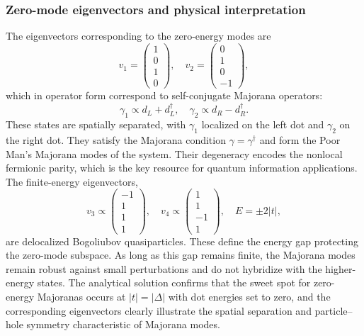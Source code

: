 \documentclass[11pt, letterpaper, titlepage]{article}
\begin{document}
\subsubsection{Zero-mode eigenvectors and physical interpretation}
The eigenvectors corresponding to the zero-energy modes are
\[
v_1 = \begin{pmatrix} 1 \\ 0 \\ 1 \\ 0 \end{pmatrix}, \quad
v_2 = \begin{pmatrix} 0 \\ 1 \\ 0 \\ -1 \end{pmatrix},
\]
which in operator form correspond to self-conjugate Majorana operators:
\[
\gamma_1 \propto d_L + d_L^\dagger, \quad
\gamma_2 \propto d_R - d_R^\dagger.
\]
These states are spatially separated, with \(\gamma_1\) localized on the left dot and \(\gamma_2\) on the right dot. They satisfy the Majorana condition \(\gamma = \gamma^\dagger\) and form the Poor Man's Majorana modes of the system. Their degeneracy encodes the nonlocal fermionic parity, which is the key resource for quantum information applications.
The finite-energy eigenvectors,
\[
v_3 \propto \begin{pmatrix}-1 \\ 1 \\ 1 \\ 1\end{pmatrix}, \quad
v_4 \propto \begin{pmatrix}1 \\ 1 \\ -1 \\ 1\end{pmatrix}, \quad
E = \pm 2|t|,
\]
are delocalized Bogoliubov quasiparticles. These define the energy gap protecting the zero-mode subspace. As long as this gap remains finite, the Majorana modes remain robust against small perturbations and do not hybridize with the higher-energy states.
The analytical solution confirms that the sweet spot for zero-energy Majoranas occurs at \(|t| = |\Delta|\) with dot energies set to zero, and the corresponding eigenvectors clearly illustrate the spatial separation and particle–hole symmetry characteristic of Majorana modes.
\end{document}
